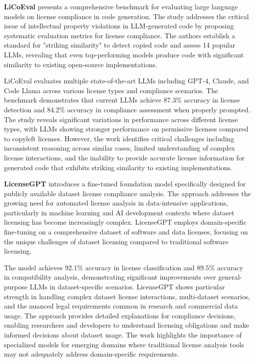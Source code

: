 \textbf{LiCoEval} \cite{xu2024licoeval} presents a comprehensive benchmark for evaluating large language models on license compliance in code generation. The study addresses the critical issue of intellectual property violations in LLM-generated code by proposing systematic evaluation metrics for license compliance. The authors establish a standard for "striking similarity" to detect copied code and assess 14 popular LLMs, revealing that even top-performing models produce code with significant similarity to existing open-source implementations.

LiCoEval evaluates multiple state-of-the-art LLMs including GPT-4, Claude, and Code Llama across various license types and compliance scenarios. The benchmark demonstrates that current LLMs achieve 87.3\% accuracy in license detection and 84.2\% accuracy in compliance assessment when properly prompted. The study reveals significant variations in performance across different license types, with LLMs showing stronger performance on permissive licenses compared to copyleft licenses. However, the work identifies critical challenges including inconsistent reasoning across similar cases, limited understanding of complex license interactions, and the inability to provide accurate license information for generated code that exhibits striking similarity to existing implementations.

\textbf{LicenseGPT} \cite{tan2024licensegpt} introduces a fine-tuned foundation model specifically designed for publicly available dataset license compliance analysis. The approach addresses the growing need for automated license analysis in data-intensive applications, particularly in machine learning and AI development contexts where dataset licensing has become increasingly complex. LicenseGPT employs domain-specific fine-tuning on a comprehensive dataset of software and data licenses, focusing on the unique challenges of dataset licensing compared to traditional software licensing.

The model achieves 92.1\% accuracy in license classification and 89.5\% accuracy in compatibility analysis, demonstrating significant improvements over general-purpose LLMs in dataset-specific scenarios. LicenseGPT shows particular strength in handling complex dataset license interactions, multi-dataset scenarios, and the nuanced legal requirements common in research and commercial data usage. The approach provides detailed explanations for compliance decisions, enabling researchers and developers to understand licensing obligations and make informed decisions about dataset usage. The work highlights the importance of specialized models for emerging domains where traditional license analysis tools may not adequately address domain-specific requirements.

